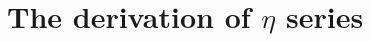 \documentclass[twocolumn,linenumbers]{aastex631}
\begin{document}
%







%
%
\appendix
\section{The derivation of $\eta$ series} \label{appendix:eta calculation}
\end{document}
